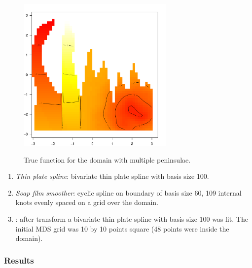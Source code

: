 \begin{figure}
\centering
\includegraphics[width=3in]{mds/figs/wt2-truth.pdf} \\
\caption{True function for the domain with multiple peninsulae.}
\label{wt2-truth}
\end{figure}

\begin{enumerate}
\item \emph{Thin plate spline}: bivariate thin plate spline with basis size 100. 
\item \emph{Soap film smoother}: cyclic spline on boundary of basis size 60, 109 internal knots evenly spaced on a grid over the domain.
\item \emph{\mdsap}: after transform a bivariate thin plate spline with basis size 100 was fit. The initial MDS grid was 10 by 10 points square (48 points were inside the domain).
\end{enumerate} 

\subsubsection{Results}

